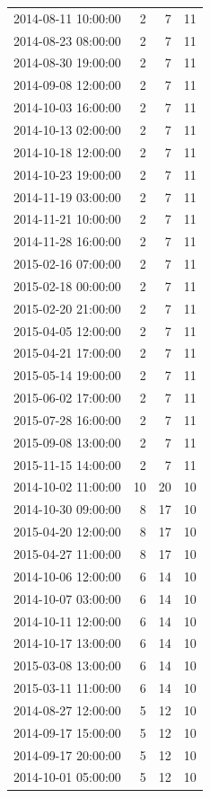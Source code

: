 \begin{tabular}{lrrr}
2014-08-11 10:00:00 & 2 & 7 & 11 \\
2014-08-23 08:00:00 & 2 & 7 & 11 \\
2014-08-30 19:00:00 & 2 & 7 & 11 \\
2014-09-08 12:00:00 & 2 & 7 & 11 \\
2014-10-03 16:00:00 & 2 & 7 & 11 \\
2014-10-13 02:00:00 & 2 & 7 & 11 \\
2014-10-18 12:00:00 & 2 & 7 & 11 \\
2014-10-23 19:00:00 & 2 & 7 & 11 \\
2014-11-19 03:00:00 & 2 & 7 & 11 \\
2014-11-21 10:00:00 & 2 & 7 & 11 \\
2014-11-28 16:00:00 & 2 & 7 & 11 \\
2015-02-16 07:00:00 & 2 & 7 & 11 \\
2015-02-18 00:00:00 & 2 & 7 & 11 \\
2015-02-20 21:00:00 & 2 & 7 & 11 \\
2015-04-05 12:00:00 & 2 & 7 & 11 \\
2015-04-21 17:00:00 & 2 & 7 & 11 \\
2015-05-14 19:00:00 & 2 & 7 & 11 \\
2015-06-02 17:00:00 & 2 & 7 & 11 \\
2015-07-28 16:00:00 & 2 & 7 & 11 \\
2015-09-08 13:00:00 & 2 & 7 & 11 \\
2015-11-15 14:00:00 & 2 & 7 & 11 \\
2014-10-02 11:00:00 & 10 & 20 & 10 \\
2014-10-30 09:00:00 & 8 & 17 & 10 \\
2015-04-20 12:00:00 & 8 & 17 & 10 \\
2015-04-27 11:00:00 & 8 & 17 & 10 \\
2014-10-06 12:00:00 & 6 & 14 & 10 \\
2014-10-07 03:00:00 & 6 & 14 & 10 \\
2014-10-11 12:00:00 & 6 & 14 & 10 \\
2014-10-17 13:00:00 & 6 & 14 & 10 \\
2015-03-08 13:00:00 & 6 & 14 & 10 \\
2015-03-11 11:00:00 & 6 & 14 & 10 \\
2014-08-27 12:00:00 & 5 & 12 & 10 \\
2014-09-17 15:00:00 & 5 & 12 & 10 \\
2014-09-17 20:00:00 & 5 & 12 & 10 \\
2014-10-01 05:00:00 & 5 & 12 & 10 \\

\end{tabular}
